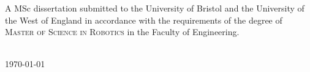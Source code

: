 \begin{titlepage}
\begin{center}
        \vspace{0.8cm}
        \begin{minipage}{10cm}
        \center A MSc dissertation submitted to the University of Bristol and the University of the West of England in accordance with the requirements of the degree of \textsc{Master of Science in Robotics} in the Faculty of Engineering.
        \end{minipage}\\
        \vspace{0.8cm}
        \today
        
    \end{center}
    
 

\end{titlepage}